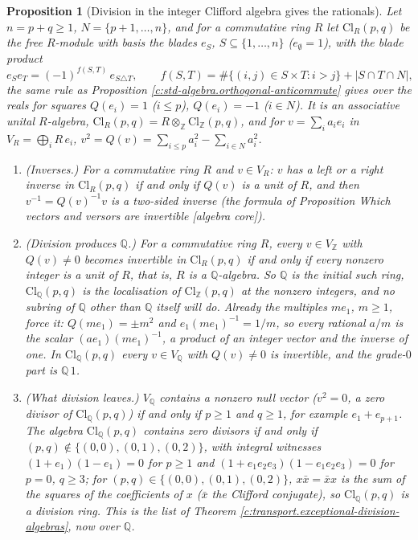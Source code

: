 \documentclass[11pt]{article}
\newtheorem{proposition}[theorem]{Proposition}
\theoremstyle{definition}
\theoremstyle{plain}
\newcommand{\changedmark}[2]{\marginpar{\raggedright\scriptsize\color{#1}#2}}
\providecommand{\Cl}{}\renewcommand{\Cl}{\mathrm{Cl}}
\providecommand{\Q}{}\renewcommand{\Q}{\mathbb{Q}}
\providecommand{\Z}{}\renewcommand{\Z}{\mathbb{Z}}
\begin{document}
\begin{proposition}[Division in the integer Clifford algebra gives the rationals]\label{c:synthesis.division-gives-the-rationals}
\changedmark{BurntOrange}{changed since the deposit}
Let $n = p + q \ge 1$, $N = \{p + 1, \dots, n\}$, and for a commutative ring $R$ let $\Cl_{R}(p,q)$ be the free $R$-module with basis the blades $e_{S}$, $S \subseteq \{1, \dots, n\}$ ($e_{\emptyset} = 1$), with the blade product
\[
e_{S}e_{T} = (-1)^{f(S,T)}\,e_{S \triangle T}, \qquad f(S,T) = \#\{(i,j) \in S \times T : i > j\} + |S \cap T \cap N| ,
\]
the same rule as Proposition \ref{c:std-algebra.orthogonal-anticommute} gives over the reals for squares $Q(e_{i}) = 1$ ($i \le p$), $Q(e_{i}) = -1$ ($i \in N$). It is an associative unital $R$-algebra, $\Cl_{R}(p,q) = R \otimes_{\Z} \Cl_{\Z}(p,q)$, and for $v = \sum_{i} a_{i}e_{i}$ in $V_{R} = \bigoplus_{i} R\,e_{i}$, $v^{2} = Q(v) = \sum_{i \le p}a_{i}^{2} - \sum_{i \in N}a_{i}^{2}$.
\begin{enumerate}
\item[(i)] \emph{(Inverses.)} For a commutative ring $R$ and $v \in V_{R}$: $v$ has a left or a right inverse in $\Cl_{R}(p,q)$ if and only if $Q(v)$ is a unit of $R$, and then $v^{-1} = Q(v)^{-1}v$ is a two-sided inverse (the formula of Proposition \emph{Which vectors and versors are invertible} [algebra core]).
\item[(ii)] \emph{(Division produces $\Q$.)} For a commutative ring $R$, every $v \in V_{\Z}$ with $Q(v) \ne 0$ becomes invertible in $\Cl_{R}(p,q)$ if and only if every nonzero integer is a unit of $R$, that is, $R$ is a $\Q$-algebra. So $\Q$ is the initial such ring, $\Cl_{\Q}(p,q)$ is the localisation of $\Cl_{\Z}(p,q)$ at the nonzero integers, and no subring of $\Q$ other than $\Q$ itself will do. Already the multiples $m e_{1}$, $m \ge 1$, force it: $Q(me_{1}) = \pm m^{2}$ and $e_{1}(me_{1})^{-1} = 1/m$, so every rational $a/m$ is the scalar $(ae_{1})(me_{1})^{-1}$, a product of an integer vector and the inverse of one. In $\Cl_{\Q}(p,q)$ every $v \in V_{\Q}$ with $Q(v) \ne 0$ is invertible, and the grade-$0$ part is $\Q\,1$.
\item[(iii)] \emph{(What division leaves.)} $V_{\Q}$ contains a nonzero null vector ($v^{2} = 0$, a zero divisor of $\Cl_{\Q}(p,q)$) if and only if $p \ge 1$ and $q \ge 1$, for example $e_{1} + e_{p+1}$. The algebra $\Cl_{\Q}(p,q)$ contains zero divisors if and only if $(p, q) \notin \{(0,0), (0,1), (0,2)\}$, with integral witnesses $(1 + e_{1})(1 - e_{1}) = 0$ for $p \ge 1$ and $(1 + e_{1}e_{2}e_{3})(1 - e_{1}e_{2}e_{3}) = 0$ for $p = 0$, $q \ge 3$; for $(p, q) \in \{(0,0), (0,1), (0,2)\}$, $x\bar{x} = \bar{x}x$ is the sum of the squares of the coefficients of $x$ ($\bar{x}$ the Clifford conjugate), so $\Cl_{\Q}(p,q)$ is a division ring. This is the list of Theorem \ref{c:transport.exceptional-division-algebras}, now over $\Q$.
\end{enumerate}
\end{proposition}
\end{document}
